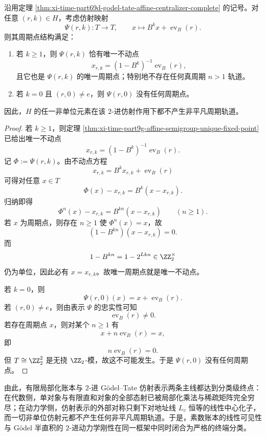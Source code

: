 \begin{theorem}\label{thm:xi-time-part69d-godel-tate-affine-no-nontrivial-periodic-orbits}
沿用定理 \ref{thm:xi-time-part69d-godel-tate-affine-centralizer-complete} 的记号。对任意 \((r,k)\in H\)，考虑仿射映射
\[
\Psi(r,k):T\to T,
\qquad
x\mapsto B^k x+\operatorname{ev}_B(r).
\]
则其周期点结构满足：
\begin{enumerate}
  \item 若 \(k\ge 1\)，则 \(\Psi(r,k)\) 恰有唯一不动点
  \[
  x_{r,k}=(1-B^k)^{-1}\operatorname{ev}_B(r),
  \]
  且它也是 \(\Psi(r,k)\) 的唯一周期点；特别地不存在任何真周期 \(n>1\) 轨道。
  \item 若 \(k=0\) 且 \((r,0)\neq e\)，则 \(\Psi(r,0)\) 没有任何周期点。
\end{enumerate}
因此，\(H\) 的任一非单位元素在该 \(2\)-进仿射作用下都不产生非平凡周期轨道。
\end{theorem}
\begin{proof}
若 \(k\ge 1\)，则定理 \ref{thm:xi-time-part9g-affine-semigroup-unique-fixed-point} 已给出唯一不动点
\[
x_{r,k}=(1-B^k)^{-1}\operatorname{ev}_B(r).
\]
记 \(\Phi:=\Psi(r,k)\)。由不动点方程
\[
x_{r,k}=B^k x_{r,k}+\operatorname{ev}_B(r)
\]
可得对任意 \(x\in T\)
\[
\Phi(x)-x_{r,k}=B^k(x-x_{r,k}).
\]
归纳即得
\[
\Phi^n(x)-x_{r,k}=B^{kn}(x-x_{r,k})
\qquad (n\ge 1).
\]
若 \(x\) 为周期点，则存在 \(n\ge 1\) 使 \(\Phi^n(x)=x\)，故
\[
(1-B^{kn})(x-x_{r,k})=0.
\]
而
\[
1-B^{kn}=1-2^{Lkn}\in \ZZ_2^\times
\]
仍为单位，因此必有 \(x=x_{r,k}\)。故唯一周期点就是唯一不动点。

若 \(k=0\)，则
\[
\Psi(r,0)(x)=x+\operatorname{ev}_B(r).
\]
若 \((r,0)\neq e\)，则由表示 \(\Psi\) 的忠实性可知
\[
\operatorname{ev}_B(r)\neq 0.
\]
若存在周期点 \(x\)，则对某个 \(n\ge 1\) 有
\[
x+n\operatorname{ev}_B(r)=x,
\]
即
\[
n\operatorname{ev}_B(r)=0.
\]
但 \(T\cong \ZZ_2^2\) 是无挠 \(\ZZ_2\)-模，故这不可能发生。于是 \(\Psi(r,0)\) 没有任何周期点。
\end{proof}

\noindent
由此，有限局部化账本与 \(2\)-进 Gödel--Tate 仿射表示两条主线都达到分类级终点：在代数侧，单对象与有限直和对象的全部态射已被局部化乘法与稀疏矩阵完全穷尽；在动力学侧，仿射表示的外部对称只剩下对地址线 \(L_v\) 恒等的线性中心化子，而一切非单位仿射元都不产生任何非平凡周期轨道。于是，素数账本的线性可见性与 Gödel 半直积的 \(2\)-进动力学刚性在同一框架中同时闭合为严格的终端分类。

\endinput
